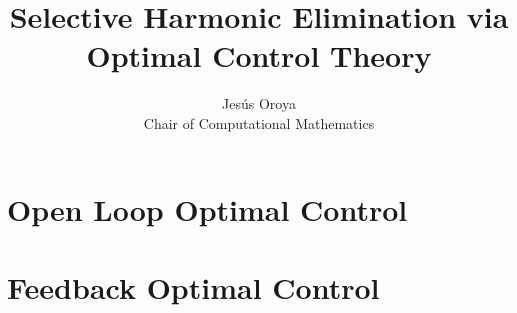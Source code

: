 \documentclass[a4paper]{book}
\title{Selective Harmonic Elimination via Optimal Control Theory}
\author{Jesús Oroya \\ Chair of Computational Mathematics}
\begin{document}
\maketitle

\tableofcontents
\newpage



\chapter{Open Loop Optimal Control}



\chapter{Feedback Optimal Control}

\appendix



 


\end{document}
